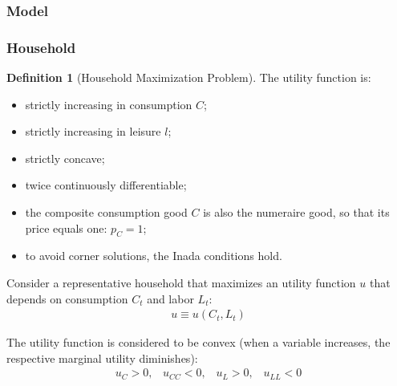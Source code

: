 \documentclass[
	12pt, 
	]{article}
\numberwithin{equation}{section}
\theoremstyle{definition}
\newtheorem{definition}{Definition}[section]
\theoremstyle{plain}
\theoremstyle{plain}
\theoremstyle{plain}
\begin{document}
\subsubsection{Model}

\subsubsection{Household}


\begin{definition}[Household Maximization Problem]
	{\singlespacing
		The utility function is:
		\begin{itemize}
			\item strictly increasing in consumption $C$;
			\item strictly increasing in leisure $l$;
			\item strictly concave;
			\item twice continuously differentiable;
			\item the composite consumption good $C$ is also the numeraire good, so that its price equals one: $p_C=1$;
			\item to avoid corner solutions, the Inada conditions\footnotemark{} hold. 
	\end{itemize}}
	
	Consider a representative household that maximizes an utility function $u$ that depends on consumption $C_t$ and labor $L_t$:
	\begin{align}
		u \equiv u \left( C_t, L_t \right)
	\end{align}
	
	The utility function is considered to be convex (when a variable increases, the respective marginal utility diminishes)\footnotemark{}: 
	\begin{align*}
		u_{C} > 0 \text{,}\quad u_{CC} < 0 \text{,}\quad
		u_{L} > 0 \text{,}\quad u_{LL} < 0
	\end{align*}
	
\end{definition}
\end{document}
